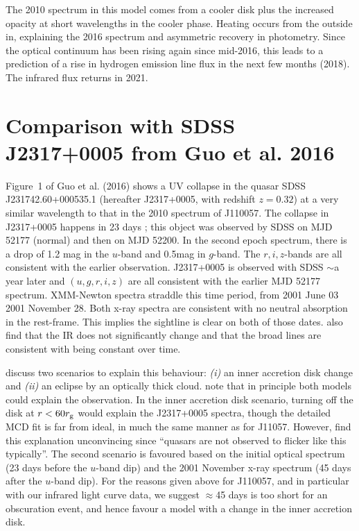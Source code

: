 \documentclass[11pt,a4paper]{article}
\begin{document}
The 2010 spectrum in this model comes from a cooler disk plus the
increased opacity at short wavelengths in the cooler phase. Heating
occurs from the outside in, explaining the 2016 spectrum and
asymmetric recovery in photometry.  Since the
optical continuum has been rising again since mid-2016, this leads to
a prediction of a rise in hydrogen emission line flux in the next few
months (2018). The infrared flux returns in 2021. 



\section*{Comparison with SDSS J2317+0005 from Guo et al. 2016}
Figure~1 of Guo et al. (2016) shows a UV collapse in the quasar SDSS
J231742.60+000535.1 (hereafter J2317+0005, with redshift $z=0.32$) at
a very similar wavelength to that in the 2010 spectrum of J110057. The
collapse in J2317+0005 happens in 23 days \citep[Figure 2 of
][]{Guo2016}; this object was observed by SDSS on MJD 52177 (normal)
and then on MJD 52200. In the second epoch spectrum, there is a drop
of 1.2 mag in the $u$-band and 0.5mag in $g$-band. The $r,i,z$-bands
are all consistent with the earlier observation. J2317+0005 is
observed with SDSS $\sim$a year later and $(u,g,r,i,z)$ are all
consistent with the earlier MJD 52177 spectrum. XMM-Newton spectra
straddle this time period, from 2001 June 03 2001 November 28. Both
x-ray spectra are consistent with no neutral absorption in the
rest-frame. This implies the sightline is clear on both of those
dates.  \citet{Guo2016} also find that the IR does not significantly
change and that the broad lines are consistent with being constant
over time.

\citet{Guo2016} discuss two scenarios to explain this behaviour: {\it
(i)} an inner accretion disk change and {\it (ii)} an eclipse by an
optically thick cloud. \citet{Guo2016} note that in principle both
models could explain the observation. In the inner accretion disk
scenario, turning off the disk at $r < 60 r_{\rm g}$ would explain the
J2317+0005 spectra, though the detailed MCD fit is far from ideal, in much the same manner as for J11057. However,
\citet{Guo2016} find this explanation unconvincing since ``quasars are
not observed to flicker like this typically''.  The second scenario is
favoured based on the initial optical spectrum (23 days before the
$u$-band dip) and the 2001 November x-ray spectrum (45 days after the
$u$-band dip).  For the reasons given above for J110057, and in
particular with our infrared light curve data, we suggest $\approx$45
days is too short for an obscuration event, and hence favour a model
with a change in the inner accretion disk.




\end{document}
